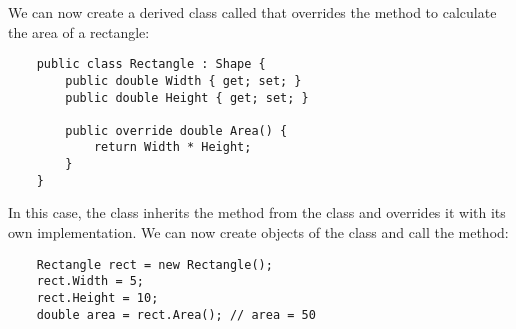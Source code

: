 \documentclass{report}
\begin{document}
We can now create a derived class called  that overrides the  method to calculate the area of a rectangle:

\begin{verbatim}
    public class Rectangle : Shape {
        public double Width { get; set; }
        public double Height { get; set; }

        public override double Area() {
            return Width * Height;
        }
    }
\end{verbatim}

In this case, the  class inherits the  method from the  class and overrides it with its own implementation. We can now create objects of the  class and call the  method:

\begin{verbatim}
    Rectangle rect = new Rectangle();
    rect.Width = 5;
    rect.Height = 10;
    double area = rect.Area(); // area = 50
\end{verbatim}
\end{document}
